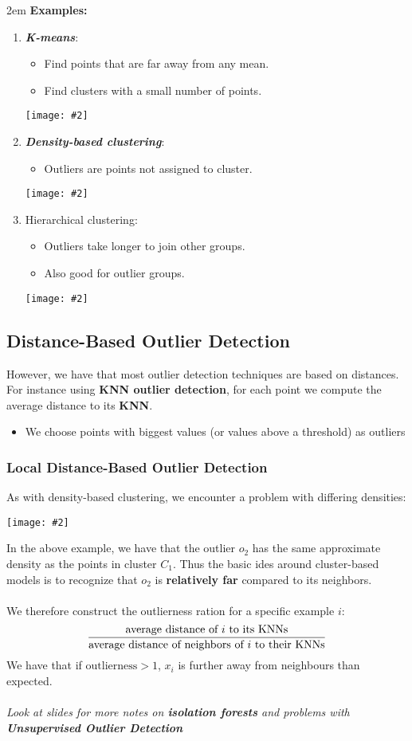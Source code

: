 \documentclass{article}
\def\blu#1{{\color{blu}#1}}
\def\gre#1{{\color{gre}#1}}
\theoremstyle{definition}
\newcommand{\centerfig}[2]{\begin{center}\texttt{[image: \#2]}\end{center}}
\begin{document}
\begingroup
\leftskip 2em
\noindent \textbf{Examples:}
\begin{enumerate}
	\item \textbf{\textit{K-means}}:
	\begin{itemize}
		\item Find points that are far away from any mean.
		\item Find clusters with a small number of points.
	\end{itemize}
\centerfig{0.6}{Pic20}
\item \textbf{\textit{Density-based clustering}}:
\begin{itemize}
	\item \blu{Outliers are points not assigned} to cluster.
\end{itemize}
\centerfig{0.6}{Pic21}
\item Hierarchical clustering:
\begin{itemize}
	\item \blu{Outliers take longer to join other groups}. 
	\item Also good for \blu{outlier groups}.
\end{itemize}
\centerfig{0.6}{Pic22}
\end{enumerate}
\endgroup

\subsection*{Distance-Based Outlier Detection}
However, we have that most outlier detection techniques are \gre{based on distances}. For instance using \blu{\textbf{KNN outlier detection}}, for each point we compute the \gre{average distance to its \textbf{KNN}}. 
\begin{itemize}
	\item We choose points with biggest values (or values above a threshold) as outliers
\end{itemize}


\subsubsection*{Local Distance-Based Outlier Detection}
As with density-based clustering, we encounter a problem with differing densities:
\centerfig{0.5}{Pic23}
In the above example, we have that the outlier $ o_2 $ has the same approximate density as the points in cluster $ C_1 $. Thus the basic ides around cluster-based models is to recognize that $ o_2 $ is \gre{\textbf{relatively far}} compared to its neighbors. \\ \\
We therefore construct the \blu{outlierness ration} for a specific example $ i $:
\begin{align*}
\frac{\text{average distance of $ i $ to its KNNs}}{\text{average distance of neighbors of $ i $ to their KNNs}}
\end{align*}
We have that if $ \text{outlierness} > 1 $, $ x_i $ is further away from neighbours than expected. \\ \\
\textit{Look at slides for more notes on \textbf{isolation forests} and problems with \textbf{Unsupervised Outlier Detection}}
\end{document}

